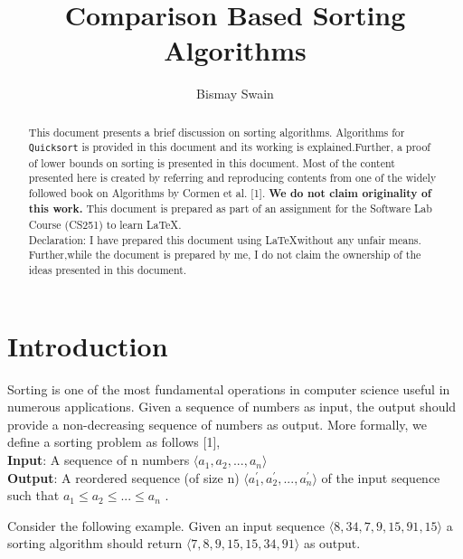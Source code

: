 \documentclass[a4paper, 10pt,twocolumn]{article}
\title{Comparison Based Sorting Algorithms}
\author{Bismay Swain}
\date{}
\begin{document}
\maketitle
\begin{abstract}
  This document presents a brief discussion on sorting algorithms. Algorithms for \texttt{Quicksort} is provided in this document and its working is explained.Further, a proof of lower bounds on sorting is presented in this document. Most of the content presented here is created by referring and reproducing contents from one of the widely followed book on Algorithms by Cormen et al. [1]. {\bf We do not claim originality of this work.} This document is prepared as part of an assignment for the Software Lab Course (CS251) to learn \LaTeX .
    \hline
    \vspace{0.01cm}
    \noindent
    \\Declaration: I have prepared this document using \LaTeX without any unfair means. Further,while the document is prepared by me, I do not claim the ownership of the ideas presented in this document.
    \hline
\end{abstract}
\section{Introduction}
Sorting is one of the most fundamental operations in computer science useful in numerous applications. Given a sequence of numbers as input, the output should provide a non-decreasing sequence of numbers as output. More formally, we define a sorting problem as follows [1],
\\{\bf Input}: A sequence of n numbers  $ \langle a_1,a_2,...,a_n \rangle $
\\{\bf Output}: A reordered sequence (of size n) $ \langle a_1^{'} ,a_2^{'} ,...,a_n^{'} \rangle$ of the input sequence such that $ a_1 \leq a_2 \leq ... \leq a_n $ .

Consider the following example. Given an input sequence $\langle 8, 34, 7, 9, 15, 91, 15 \rangle$ a sorting algorithm should return $\langle 7, 8, 9, 15, 15, 34, 91 \rangle$ as output.
\end{document}
